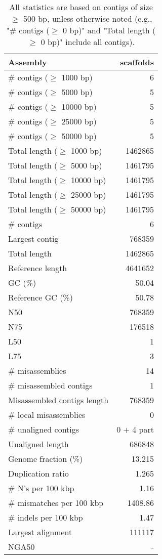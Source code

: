 \documentclass[12pt,a4paper]{article}
\begin{document}
\begin{table}[ht]
\begin{center}
\caption{All statistics are based on contigs of size $\geq$ 500 bp, unless otherwise noted (e.g., "\# contigs ($\geq$ 0 bp)" and "Total length ($\geq$ 0 bp)" include all contigs).}
\begin{tabular}{|l*{1}{|r}|}
\hline
Assembly & scaffolds \\ \hline
\# contigs ($\geq$ 1000 bp) & 6 \\ \hline
\# contigs ($\geq$ 5000 bp) & 5 \\ \hline
\# contigs ($\geq$ 10000 bp) & 5 \\ \hline
\# contigs ($\geq$ 25000 bp) & 5 \\ \hline
\# contigs ($\geq$ 50000 bp) & 5 \\ \hline
Total length ($\geq$ 1000 bp) & 1462865 \\ \hline
Total length ($\geq$ 5000 bp) & 1461795 \\ \hline
Total length ($\geq$ 10000 bp) & 1461795 \\ \hline
Total length ($\geq$ 25000 bp) & 1461795 \\ \hline
Total length ($\geq$ 50000 bp) & 1461795 \\ \hline
\# contigs & 6 \\ \hline
Largest contig & 768359 \\ \hline
Total length & 1462865 \\ \hline
Reference length & 4641652 \\ \hline
GC (\%) & 50.04 \\ \hline
Reference GC (\%) & 50.78 \\ \hline
N50 & 768359 \\ \hline
N75 & 176518 \\ \hline
L50 & 1 \\ \hline
L75 & 3 \\ \hline
\# misassemblies & 14 \\ \hline
\# misassembled contigs & 1 \\ \hline
Misassembled contigs length & 768359 \\ \hline
\# local misassemblies & 0 \\ \hline
\# unaligned contigs & 0 + 4 part \\ \hline
Unaligned length & 686848 \\ \hline
Genome fraction (\%) & 13.215 \\ \hline
Duplication ratio & 1.265 \\ \hline
\# N's per 100 kbp & 1.16 \\ \hline
\# mismatches per 100 kbp & 1408.86 \\ \hline
\# indels per 100 kbp & 1.47 \\ \hline
Largest alignment & 111117 \\ \hline
NGA50 & - \\ \hline
\end{tabular}
\end{center}
\end{table}
\end{document}
